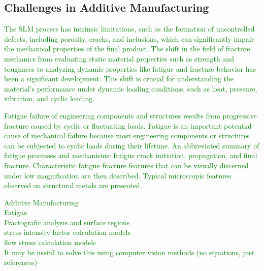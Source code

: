 \documentclass[preprint,12pt]{elsarticle}
\begin{document}
\subsection{Challenges in Additive Manufacturing}
\textcolor{green}{

The SLM process has intrinsic limitations, such as the formation of uncontrolled defects, including porosity, cracks, and inclusions, which can significantly impair the mechanical properties of the final product. The shift in the field of fracture mechanics from evaluating static material properties such as strength and toughness to analyzing dynamic properties like fatigue and fracture behavior has been a significant development. This shift is crucial for understanding the material's performance under dynamic loading conditions, such as heat, pressure, vibration, and cyclic loading.

Fatigue failure of engineering components and structures results from progressive fracture caused by cyclic or fluctuating loads. Fatigue is an important potential cause of mechanical failure because most engineering components or structures can be subjected to cyclic loads during their lifetime.
An abbreviated summary of fatigue processes and mechanisms: fatigue crack initiation, propagation, and final fracture. Characteristic fatigue fracture features that can be visually discerned under low magnification are then described.
Typical microscopic features observed on structural metals are presented.}

\textcolor{green}{Additive Manufacturing\\Fatigue\\Fractografic analysis and surface regions\\stress intensity factor calculation models\\flow stress calculation models\\It may be useful to solve this using computer vision methods  (no equations, just references)}
\end{document}
